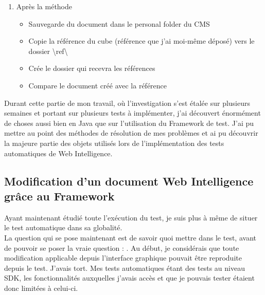 \begin{enumerate}
\begin{itemize}
	\end{itemize}
	\item Apr\`{e}s la m\'{e}thode 
	\begin{itemize}
		\item Sauvegarde du document dans le personal folder du \gls{CMS}
		\item Copie la r\'{e}f\'{e}rence du cube (r\'{e}f\'{e}rence que j'ai moi-m\^{e}me d\'{e}pos\'{e}) vers le dossier \textbackslash ref\textbackslash
		\item Cr\'{e}e le dossier qui recevra les r\'{e}f\'{e}rences
		\item Compare le document cr\'{e}\'{e} avec la r\'{e}f\'{e}rence
	\end{itemize}
\end{enumerate}

Durant cette partie de mon travail, o\`{u} l'investigation s'est \'{e}tal\'{e}e sur plusieurs semaines et portant sur plusieurs tests \`{a} impl\'{e}menter, j'ai d\'{e}couvert \'{e}norm\'{e}ment de choses aussi bien en \gls{Java} que sur l'utilisation du \gls{Framework} de test. J'ai pu mettre au point des m\'{e}thodes de r\'{e}solution de mes probl\`{e}mes et ai pu d\'{e}couvrir la majeure partie des objets utilis\'{e}s lors de l'impl\'{e}mentation des tests automatiques de Web Intelligence.


\subsection{Modification d'un document Web Intelligence gr\^{a}ce au \gls{Framework}}

Ayant maintenant \'{e}tudi\'{e} toute l'ex\'{e}cution du test, je suis plus \`{a} m\^{e}me de situer le test automatique dans sa globalit\'{e}.\\
La question qui se pose maintenant est de savoir quoi mettre dans le test, avant de pouvoir se poser la vraie question : . Au d\'{e}but, je consid\'{e}rais que toute modification applicable depuis l'interface graphique pouvait \^{e}tre reproduite depuis le test. J'avais tort. Mes tests automatiques \'{e}tant des tests au niveau SDK, les fonctionnalit\'{e}s auxquelles j'avais acc\`{e}s et que je pouvais tester \'{e}taient donc limit\'{e}es \`{a} celui-ci.\\

